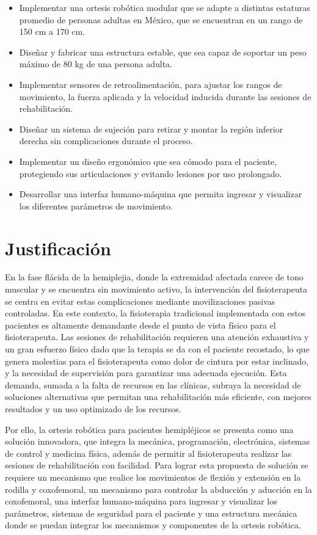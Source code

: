 \begin{itemize}
	\item	Implementar una ortesis robótica modular que se adapte a distintas estaturas promedio de personas adultas en México, que se encuentran en un rango de 150 cm a 170 cm.
	\item	Diseñar y fabricar una estructura estable, que sea capaz de soportar un peso máximo de 80 kg de una persona adulta.
	\item	Implementar sensores de retroalimentación, para ajustar los rangos de movimiento, la fuerza aplicada y la velocidad inducida durante las sesiones de rehabilitación.
	\item	Diseñar un sistema de sujeción para retirar y montar la región inferior derecha sin complicaciones durante el proceso.
	\item	Implementar un diseño ergonómico que sea cómodo para el paciente, protegiendo sus articulaciones y evitando lesiones por uso prolongado.
	\item	Desarrollar una interfaz humano-máquina que permita ingresar y visualizar los diferentes parámetros de movimiento.
\end{itemize}

\section{Justificación}

En la fase flácida de la hemiplejia, donde la extremidad afectada carece de tono muscular y se encuentra sin movimiento activo, la intervención del fisioterapeuta se centra en evitar estas complicaciones mediante movilizaciones pasivas controladas. En este contexto, la fisioterapia tradicional implementada con estos pacientes es altamente demandante desde el punto de vista físico para el fisioterapeuta. Las sesiones de rehabilitación requieren una atención exhaustiva y un gran esfuerzo físico dado que la terapia se da con el paciente recostado, lo que genera molestias para el fisioterapeuta como dolor de cintura por estar inclinado, y la necesidad de supervisión para garantizar una adecuada ejecución. Esta demanda, sumada a la falta de recursos en las clínicas, subraya la necesidad de soluciones alternativas que permitan una rehabilitación más eficiente, con mejores resultados y un uso optimizado de los recursos\cite{04}.

Por ello, la ortesis robótica para pacientes hemipléjicos se presenta como una solución innovadora, que integra la mecánica, programación, electrónica, sistemas de control y medicina física, además de permitir al fisioterapeuta realizar las sesiones de rehabilitación con facilidad. Para lograr esta propuesta de solución se requiere un mecanismo que realice los movimientos de flexión y extensión en la rodilla y coxofemoral, un mecanismo para controlar la abducción y aducción en la coxofemoral, una interfaz humano-máquina para ingresar y visualizar los parámetros, sistemas de seguridad para el paciente y una estructura mecánica donde se puedan integrar los mecanismos y componentes de la ortesis robótica.

